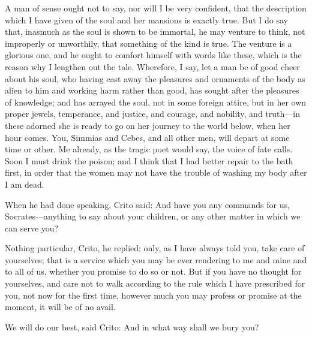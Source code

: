 \documentclass[11pt,letter]{article}
\begin{document}
\par  A man of sense ought not to say, nor will I be very confident, that the description which I have given of the soul and her mansions is exactly true. But I do say that, inasmuch as the soul is shown to be immortal, he may venture to think, not improperly or unworthily, that something of the kind is true. The venture is a glorious one, and he ought to comfort himself with words like these, which is the reason why I lengthen out the tale. Wherefore, I say, let a man be of good cheer about his soul, who having cast away the pleasures and ornaments of the body as alien to him and working harm rather than good, has sought after the pleasures of knowledge; and has arrayed the soul, not in some foreign attire, but in her own proper jewels, temperance, and justice, and courage, and nobility, and truth—in these adorned she is ready to go on her journey to the world below, when her hour comes. You, Simmias and Cebes, and all other men, will depart at some time or other. Me already, as the tragic poet would say, the voice of fate calls. Soon I must drink the poison; and I think that I had better repair to the bath first, in order that the women may not have the trouble of washing my body after I am dead.

\par  When he had done speaking, Crito said: And have you any commands for us, Socrates—anything to say about your children, or any other matter in which we can serve you?

\par  Nothing particular, Crito, he replied: only, as I have always told you, take care of yourselves; that is a service which you may be ever rendering to me and mine and to all of us, whether you promise to do so or not. But if you have no thought for yourselves, and care not to walk according to the rule which I have prescribed for you, not now for the first time, however much you may profess or promise at the moment, it will be of no avail.

\par  We will do our best, said Crito: And in what way shall we bury you?
\end{document}
